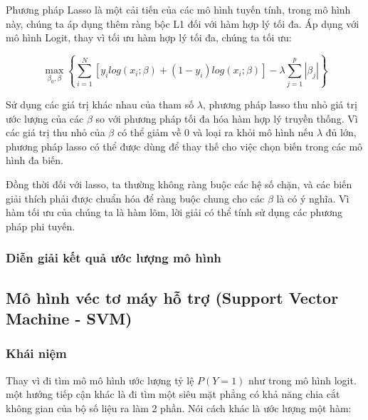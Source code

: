 \documentclass[a4paper]{report}\usepackage[]{graphicx}\usepackage[]{color}
\begin{document}
Phương pháp Lasso là một cải tiến của các mô hình tuyến tính, trong mô hình này, chúng ta áp dụng thêm ràng bộc L1 đối với hàm hợp lý tối đa. Áp dụng với mô hình Logit, thay vì tối ưu hàm hợp lý tối đa, chúng ta tối ưu:

{\large
$$
\max_{\beta_0, \beta} \left \{ \sum_{i = 1}^N [ y_i log (x_i ; \beta) + (1- y_i)log (x_i; \beta)] - \lambda \sum_{j = 1}^p|\beta_j|\right \}
$$
}

Sử dụng các giá trị khác nhau của tham số $\lambda$, phương pháp lasso thu nhỏ giá trị ước lượng của các $\beta$ so với phương pháp tối đa hóa hàm hợp lý truyền thống. Vì các giá trị thu nhỏ của $\beta$ có thể giảm về 0 và loại ra khỏi mô hình nếu $\lambda$ đủ lớn, phương pháp lasso có thể được dùng để thay thế cho việc chọn biến trong các mô hình đa biến.

Đồng thời đối với lasso, ta thường không ràng buộc các hệ số chặn, và các biến giải thích phải được chuẩn hóa để ràng buộc chung cho các $\beta$ là có ý nghĩa. Vì hàm tối ưu của chúng ta là hàm lõm, lời giải có thể tính sử dụng các phương pháp phi tuyến. %


\subsubsection{Diễn giải kết quả ước lượng mô hình}

\subsection{Mô hình véc tơ máy hỗ trợ (Support Vector Machine - SVM)}

\subsubsection{Khái niệm}
Thay vì đi tìm mô mô hình ước lượng tỷ lệ $P(Y =1)$ như trong mô hình logit. một hướng tiếp cận khác là đi tìm một siêu mặt phẳng có khả năng chia cắt không gian của bộ số liệu ra làm 2 phần. Nói cách khác là ước lượng một hàm:
\end{document}
